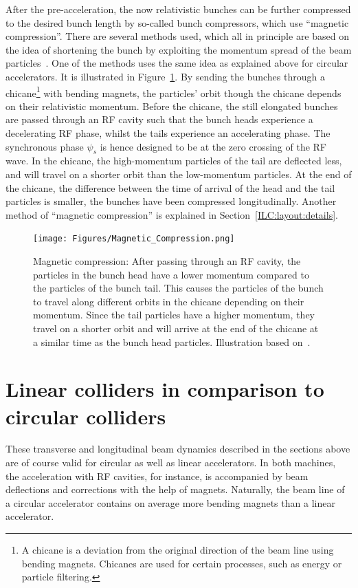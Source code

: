 After the pre-acceleration, the now relativistic bunches can be further compressed to the desired bunch length by so-called bunch compressors, which use ``magnetic compression''.
There are several methods used, which all in principle are based on the idea of shortening the bunch by exploiting the momentum spread of the beam particles~\cite[cf. p. 378ff]{Wiedemann}.
One of the methods uses the same idea as explained above for circular accelerators.
It is illustrated in Figure~\ref{fig:Magnetic_compression}.
By sending the bunches through a chicane\footnote{A chicane is a deviation from the original direction of the beam line using bending magnets. Chicanes are used for certain processes, such as energy or particle filtering.} with bending magnets, the particles' orbit though the chicane depends on their relativistic momentum.
Before the chicane, the still elongated bunches are passed through an RF cavity such that the bunch heads experience a decelerating RF phase, whilst the tails experience an accelerating phase.
The synchronous phase $\psi_s$ is hence designed to be at the zero crossing of the RF wave.
In the chicane, the high-momentum particles of the tail are deflected less, and will travel on a shorter orbit than the low-momentum particles.
At the end of the chicane, the difference between the time of arrival of the head and the tail particles is smaller, the bunches have been compressed longitudinally.
Another method of ``magnetic compression'' is explained in Section~\ref{ILC:layout:details}.
\begin{figure}[h]
\centering
\texttt{[image: Figures/Magnetic\_Compression.png]}
\caption[Illustration explaining ``magnetic compression'' in a chicane]{Magnetic compression: After passing through an RF cavity, the particles in the bunch head have a lower momentum compared to the particles of the bunch tail.
This causes the particles of the bunch to travel along different orbits in the chicane depending on their momentum.
Since the tail particles have a higher momentum, they travel on a shorter orbit and will arrive at the end of the chicane at a similar time as the bunch head particles.
Illustration based on~\cite[p. 75]{Bunching}.}
\label{fig:Magnetic_compression}
\end{figure}

\section{Linear colliders in comparison to circular colliders}
\label{AccPhysics:Linear-Circular}
These transverse and longitudinal beam dynamics described in the sections above are of course valid for circular as well as linear accelerators.
In both machines, the acceleration with RF cavities, for instance, is accompanied by beam deflections and corrections with the help of magnets.
Naturally, the beam line of a circular accelerator contains on average more bending magnets than a linear accelerator.

